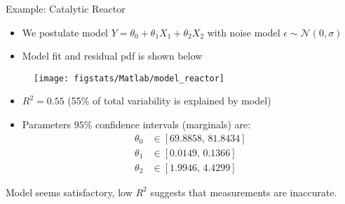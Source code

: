 \documentclass[9pt]{beamer}
\begin{document}
%
\begin{frame}{Example: Catalytic Reactor}

\begin{block}{}
\begin{itemize}
\item We postulate model $Y=\theta_0+\theta_1X_1 + \theta_2 X_2$ with noise model $\epsilon \sim \mathcal{N}(0,\sigma)$
\item Model fit and residual pdf is shown below 
\end{itemize}
\end{block}


\begin{figure}[!htb]
    \centering
	\texttt{[image: figstats/Matlab/model\_reactor]}
\end{figure}

\begin{itemize}
\item $R^2=0.55$ (55\% of total variability is explained by model)
\item Parameters $95\%$ confidence intervals (marginals) are:
\begin{align*}
 \theta_0&\in [69.8858, \,81.8434]\\ 
 \theta_1&\in  [0.0149,\,    0.1366]\\
  \theta_2&\in [1.9946,\,   4.4299]
\end{align*}
\end{itemize}
\begin{block}{}
\begin{center}
Model seems satisfactory, low $R^2$ suggests that measurements are inaccurate. 
\end{center}
\end{block}

\end{frame}
\end{document}

